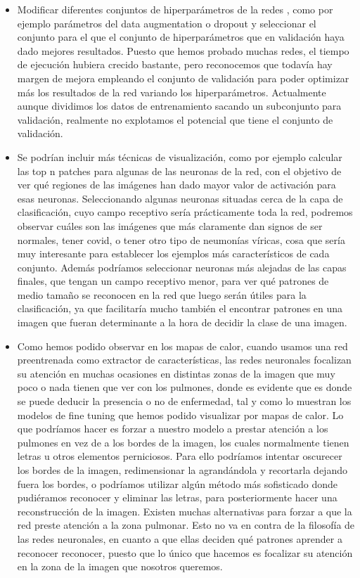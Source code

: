\documentclass[11pt,a4paper]{article}
\theoremstyle{definition}
\begin{document}
\begin{itemize}
\item Modificar diferentes conjuntos de hiperparámetros de la redes , como por ejemplo parámetros del data augmentation o dropout y seleccionar el conjunto para el que el conjunto de hiperparámetros que en validación haya dado mejores resultados.  Puesto que hemos probado muchas redes, el tiempo de ejecución hubiera crecido bastante, pero reconocemos que todavía hay margen de mejora empleando el conjunto de validación para poder optimizar más los resultados de la red variando los hiperparámetros. Actualmente aunque dividimos los datos de entrenamiento sacando un subconjunto para validación, realmente no explotamos el potencial que tiene el conjunto de validación.
\item Se podrían incluir más técnicas de visualización, como por ejemplo calcular las top n patches para algunas de las neuronas de la red, con el objetivo de ver qué regiones de las imágenes han dado mayor valor de activación para esas neuronas. Seleccionando algunas neuronas situadas cerca de la capa de clasificación, cuyo campo receptivo sería prácticamente toda la red, podremos observar cuáles son las imágenes que más claramente dan signos de ser normales, tener covid, o tener otro tipo de neumonías víricas, cosa que sería muy interesante para establecer los ejemplos más característicos de cada conjunto. Además podríamos seleccionar neuronas más alejadas de las capas finales, que tengan un campo receptivo menor, para ver qué patrones de medio tamaño se reconocen en la red que luego serán útiles para la clasificación, ya que facilitaría mucho también el encontrar patrones en una imagen que fueran determinante a la hora de decidir la clase de una imagen.
\item Como hemos podido observar en los mapas de calor, cuando usamos una red preentrenada como extractor de características,  las redes neuronales focalizan su atención en muchas ocasiones en distintas zonas de la imagen que muy poco o nada tienen que ver con los pulmones, donde es evidente que es donde se puede deducir la presencia o no de enfermedad,  tal y como lo muestran los modelos de fine tuning que hemos podido visualizar por mapas de calor.  Lo que podríamos hacer es forzar a nuestro modelo a prestar atención a los pulmones en vez de a los bordes de la imagen, los cuales normalmente tienen letras u otros elementos perniciosos. Para ello podríamos intentar oscurecer los bordes de la imagen,  redimensionar la agrandándola y recortarla dejando fuera los bordes, o podríamos utilizar algún método más sofisticado donde pudiéramos reconocer y eliminar las letras, para posteriormente hacer una reconstrucción de la imagen.  Existen muchas alternativas para forzar a que la red preste atención a la zona pulmonar. Esto no va en contra de la filosofía de las redes neuronales, en cuanto a que ellas deciden qué patrones aprender a reconocer reconocer, puesto que lo único que hacemos es focalizar su atención en la zona de la imagen que nosotros queremos.
\end{itemize}

\cleardoublepage




\end{document}
